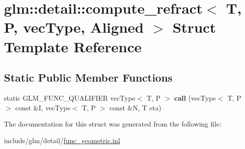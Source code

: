 \hypertarget{structglm_1_1detail_1_1compute__refract}{}\section{glm\+:\+:detail\+:\+:compute\+\_\+refract$<$ T, P, vec\+Type, Aligned $>$ Struct Template Reference}
\label{structglm_1_1detail_1_1compute__refract}
\subsection*{Static Public Member Functions}
\begin{DoxyCompactItemize}
\item 
\mbox{\label{structglm_1_1detail_1_1compute__refract_a62599a8a75bbedf57bbf271350984669}} 
static G\+L\+M\+\_\+\+F\+U\+N\+C\+\_\+\+Q\+U\+A\+L\+I\+F\+I\+ER vec\+Type$<$ T, P $>$ {\bfseries call} (vec\+Type$<$ T, P $>$ const \&I, vec\+Type$<$ T, P $>$ const \&N, T eta)
\end{DoxyCompactItemize}


The documentation for this struct was generated from the following file\+:\begin{DoxyCompactItemize}
\item 
include/glm/detail/\hyperlink{func__geometric_8inl}{func\+\_\+geometric.\+inl}\end{DoxyCompactItemize}
